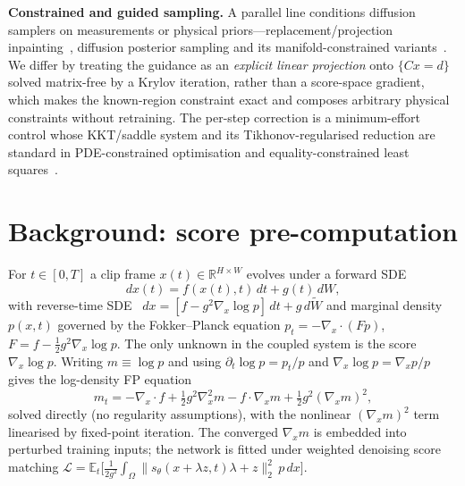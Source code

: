 \noindent\textbf{Constrained and guided sampling.} A parallel line conditions
diffusion samplers on measurements or physical priors---replacement/projection
inpainting~\cite{lugmayr-2022-repaint}, diffusion posterior
sampling and its manifold-constrained variants~\cite{chung-2023-dps}. We differ
by treating the guidance as an \emph{explicit linear projection} onto $\{Cx=d\}$
solved matrix-free by a Krylov iteration, rather than a score-space gradient,
which makes the known-region constraint exact and composes arbitrary physical
constraints without retraining. The per-step correction is a minimum-effort
control whose KKT/saddle system and its Tikhonov-regularised reduction are
standard in PDE-constrained optimisation and equality-constrained least
squares~\cite{nocedal-2006-numopt,benzi-2005-saddle}. 

\section{Background: score pre-computation}

For $t\in[0,T]$ a clip frame $x(t)\in\mathbb{R}^{H\times W}$ evolves under a
forward SDE
\begin{equation}
  dx(t) = f(x(t),t)\,dt + g(t)\,dW,
  \label{eq:forward_sde}
\end{equation}
with reverse-time SDE~\cite{anderson-1982}
$dx = [f - g^2\nabla_x\log p]\,dt + g\,d\tilde W$ and marginal density $p(x,t)$
governed by the Fokker--Planck equation
$p_t = -\nabla_x\!\cdot(F p)$, $F = f - \tfrac12 g^2\nabla_x\log p$. The only
unknown in the coupled system is the score $\nabla_x\log p$. Writing
$m\equiv\log p$ and using $\partial_t\log p = p_t/p$ and
$\nabla_x\log p = \nabla_x p / p$ gives the log-density FP equation
\begin{equation}
  m_t = -\nabla_x\!\cdot f + \tfrac12 g^2\nabla_x^2 m
        - f\!\cdot\!\nabla_x m + \tfrac12 g^2 (\nabla_x m)^2,
  \label{eq:log-FP}
\end{equation}
solved directly (no regularity assumptions), with the nonlinear $(\nabla_x m)^2$
term linearised by fixed-point iteration. The converged $\nabla_x m$ is embedded
into perturbed training inputs; the network is fitted under weighted denoising
score matching
$\mathcal{L}=\mathbb{E}_t\big[\tfrac{1}{2g^2}\!\int_\Omega \|s_\theta(x{+}\lambda z,t)\lambda + z\|_2^2\,p\,dx\big]$.


